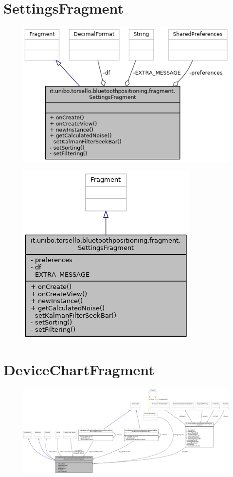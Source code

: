 \section{SettingsFragment}
\begin{figure}[ph]
	\centering
	\includegraphics[width=0.7\linewidth]{img/uml/class/classit_1_1unibo_1_1torsello_1_1bluetoothpositioning_1_1fragment_1_1SettingsFragment__coll__graph.png}
	\caption{}
\end{figure}

\begin{figure}[ph]
	\centering
	\includegraphics[width=0.5\linewidth]{img/uml/class/classit_1_1unibo_1_1torsello_1_1bluetoothpositioning_1_1fragment_1_1SettingsFragment__inherit__graph.png}
	\caption{}
\end{figure}

\newpage
\section{DeviceChartFragment}
\begin{figure}[ph]
	\centering
	\includegraphics[width=1.2\linewidth]{img/uml/class/classit_1_1unibo_1_1torsello_1_1bluetoothpositioning_1_1fragment_1_1devicesObservers_1_1DeviceChartFragment__coll__graph.png}
	\caption{}
\end{figure}

